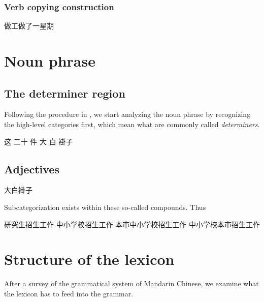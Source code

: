 \documentclass[UTF8, a4paper, oneside, scheme=plain, 12pt]{ctexrep}
\newcommand*{\term}[1]{\emph{#1}}
\begin{document}
\subsubsection{Verb copying construction}

\begin{exe}
    \ex 做工做了一星期
\end{exe}

\section{Noun phrase}

\subsection{The determiner region}

Following the procedure in ,
we start analyzing the noun phrase by recognizing the high-level categories first,
which mean what are commonly called \term{determiners}.



\begin{exe}
    \ex 这 二十 件 大 白 褂子 
\end{exe}

\subsection{Adjectives}

\begin{exe}
    \ex 大白褂子
\end{exe}

Subcategorization exists within these so-called compounds.
Thus 

\begin{exe}
    \ex \begin{xlist}
        \ex 研究生招生工作
        \ex 中小学校招生工作
        \ex 本市中小学校招生工作
        \ex *中小学校本市招生工作
    \end{xlist}
\end{exe}

\section{Structure of the lexicon}

After a survey of the grammatical system of Mandarin Chinese,
we examine what the lexicon has to feed into the grammar.
\end{document}
